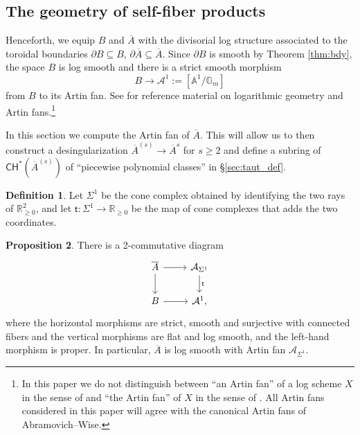 \documentclass[11pt]{article}
\def\CH{\mathsf{CH}}
\newcommand{\RR}{\mathbb{R}}
\newcommand{\barA}{\overline{A}}
\theoremstyle{definition}
\newtheorem{definition}{Definition}[section]
\newtheorem{proposition}[definition]{Proposition}
\begin{document}
\subsection{The geometry of self-fiber products} \label{sec:An}

Henceforth, we equip $B$ and $\barA$ with the divisorial log structure associated to the
toroidal boundaries $\partial B\subseteq B$, $\partial \barA\subseteq \barA$.
Since $\partial B$ is smooth by Theorem \ref{thm:bdy}, the space $B$ is log
smooth and there is a strict smooth morphism
$$
B\to \mathcal{A}^{1}:=[\mathbb{A}^{1}/\mathbb{G}_m]
$$
from $B$ to its Artin fan.
See \cite{SkeletonsAndFAbramo2015,AModuliStackCavali2017,LecturesOnLogOgus2018} for reference material on logarithmic geometry and Artin fans.\footnote{In this paper we do not distinguish between ``an Artin fan'' of a log scheme $X$ in the sense of \cite[Definition 43]{LogarithmicTauPandha2024} and ``the Artin fan'' of $X$ in the sense of \cite{Birational_inva_Abramo_2013}. All Artin fans considered in this paper will agree with the canonical Artin fans of Abramovich--Wise.}

In this section we compute the Artin fan of
$\barA$. This will allow us to then construct a desingularization $\barA^{(s)} \to\barA^s$ for $s \geq 2$ and define a subring of $\CH^{\ast}(\barA^{(s)})$ of ``piecewise polynomial classes'' in \S \ref{sec:taut_def}.

\begin{definition}
    Let $\Sigma^1$ be the cone complex obtained by identifying the two rays of $\RR_{\geq0}^2$, and let $\mathsf{t}:\Sigma^1\to\mathbb R_{\geq0}$ be the map of cone complexes that adds the two coordinates.
\end{definition}

\begin{proposition}\label{pro:Atrop}
	There is a 2-commutative diagram
	\[
	\begin{tikzcd}
		\barA \arrow[d] \arrow[r] & \mathcal A_{\Sigma^1} \arrow[d, "\mathsf{t}"] \\
		B \arrow[r] & \mathcal{A}^1,
	\end{tikzcd}
	\]
	where the horizontal morphisms are strict, smooth and surjective with connected fibers and the vertical morphisms are
	flat and log smooth, and the left-hand morphism is proper. In particular, $\barA$ is log smooth with Artin fan $\mathcal A_{\Sigma^1}$.
\end{proposition}
\end{document}
